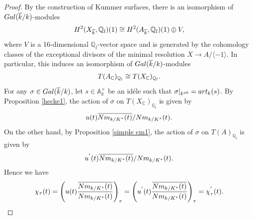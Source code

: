 \documentclass[10pt,a4paper]{amsart}
\begin{document}
      \begin{proof}By the construction of Kummer surfaces, there is an isomorphism of ${\rm Gal}(\overline{k}/k)$-modules
      \begin{align}
          H^{2}(X_{\overline{k}}, \mathbb{Q}_{l})(1)\cong H^{2}(A_{\overline{k}}, \mathbb{Q}_{l})(1)\oplus V, \notag 
      \end{align}
      where $V$ is a 16-dimensional $\mathbb{Q}_{l}$-vector space and is generated by the cohomology classes of the exceptional divisors of the minimal resolution $X\to A/\langle-1\rangle$. In particular, this induces an isomorphism of ${\rm Gal}(\overline{k}/k)$-modules
          \begin{align}
              T(A_{\mathbb{C}})_{\mathbb{Q}_{l}}\cong T(X_{\mathbb{C}})_{\mathbb{Q}_{l}}.  \notag 
          \end{align}
          For any $\sigma\in{\rm Gal}(\overline{k}/k)$, let $s\in \mathbb{A}^{\times}_{k}$ be an id\'ele such that  $\sigma|_{k^{ab}}={\rm art}_{k}(s)$.  By Proposition \ref{hecke1}, the action of $\sigma$ on $T(X_{\mathbb{C}})_{\mathbb{Q}_{l}}$ is given by 
          \begin{align}u(t)\overline{{\rm Nm}_{k/K^{\ast}}(t)}/{\rm Nm}_{k/K^{\ast}}(t).\notag 
          \end{align}On the other hand, by  Proposition \ref{simple cm1}, the action of $\sigma$ on $T(A)_{\mathbb{Q}_{l}}$ is given by 
          \begin{align}
          u^{'}(t)\overline{{\rm Nm}_{k/K^{\ast}}(t)}/{\rm Nm}_{k/K^{\ast}}(t). \notag 
          \end{align}Hence we have
          \begin{align}
              \chi_{\tau}(t)=\left(u(t)\frac{\overline{{\rm Nm}_{k/K^{\ast}}(t)}}{{\rm Nm}_{k/K^{\ast}}(t)}\right)_{\tau}=\left(u^{'}(t)\frac{\overline{{\rm Nm}_{k/K^{\ast}}(t)}}{{\rm Nm}_{k/K^{\ast}}(t)}\right)_{\tau}=\chi^{'}_{\tau}(t).\notag 
          \end{align}
      \end{proof} 
\end{document}
